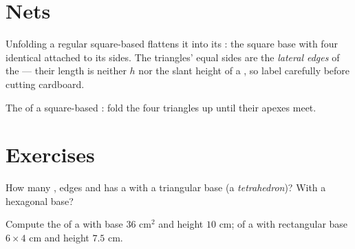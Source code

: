\section{Nets}

\begin{example}\label{ex:g8:solids:net}
Unfolding a regular square-based  flattens it into its
\emph{}: the square base with four identical 
attached to its sides. The triangles' equal sides are the
\emph{lateral edges} of the  --- their length is neither $h$
nor the slant height of a , so label carefully before cutting
cardboard.
\end{example}

\begin{omfigure}

{\small The  of a square-based : fold the four triangles up
until their apexes meet.}
\end{omfigure}

\section{Exercises}

\begin{exercise}[$\star$]\label{exo:g8:solids:1}
How many , edges and  has a  with a triangular
base (a \emph{tetrahedron})? With a hexagonal base?
\end{exercise}

\begin{exercise}[$\star$]\label{exo:g8:solids:2}
Compute the  of a  with base  $36$ cm$^2$ and
height $10$ cm; of a  with rectangular base
$6 \times 4$ cm and height $7.5$ cm.
\end{exercise}


